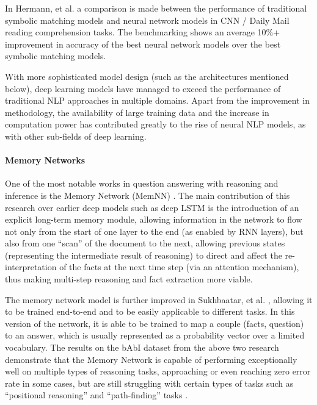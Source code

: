 \documentclass[]{article}
\begin{document}
In Hermann, et al. \cite{hermann2015teaching} a comparison is made between the performance of traditional symbolic matching models and neural network models in CNN / Daily Mail reading comprehension tasks. The benchmarking shows an average 10\%+ improvement in accuracy of the best neural network models over the best symbolic matching models. 

With more sophisticated model design (such as the architectures mentioned below), deep learning models have managed to exceed the performance of traditional NLP approaches in multiple domains. Apart from the improvement in methodology, the availability of large training data and the increase in computation power has contributed greatly to the rise of neural NLP models, as with other sub-fields of deep learning.

\paragraph{Memory Networks}
One of the most notable works in question answering with reasoning and inference is the Memory Network (MemNN) \cite{weston2014memory}. The main contribution of this research over earlier deep models such as deep LSTM is the introduction of an explicit long-term memory module, allowing information in the network to flow not only from the start of one layer to the end (as enabled by RNN layers), but also from one “scan” of the document to the next, allowing previous states (representing the intermediate result of reasoning) to direct and affect the re-interpretation of the facts at the next time step (via an attention mechanism), thus making multi-step reasoning and fact extraction more viable. 

The memory network model is further improved in Sukhbaatar, et al. \cite{sukhbaatar2015end}, allowing it to be trained end-to-end and to be easily applicable to different tasks. In this version of the network, it is able to be trained to map a couple (facts, question) to an answer, which is usually represented as a probability vector over a limited vocabulary. The results on the bAbI dataset from the above two research demonstrate that the Memory Network is capable of performing exceptionally well on multiple types of reasoning tasks, approaching or even reaching zero error rate in some cases, but are still struggling with certain types of tasks such as “positional reasoning” and “path-finding” tasks \cite{weston2014memory, sukhbaatar2015end}.
\end{document}
